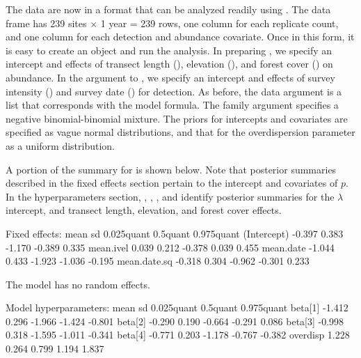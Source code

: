 \documentclass[codesnippet]{jss}
\begin{document}
The data are now in a format that can be analyzed readily using . The data frame has 239 sites $\times$ 1 year = 239 rows, one column for each replicate count, and one column for each detection and abundance covariate. Once in this form, it is easy to create an  object and run the analysis. In preparing , we specify an intercept and effects of transect length (), elevation (), and forest cover () on abundance. In the  argument to , we specify an intercept and effects of survey intensity () and survey date () for detection. As before, the data argument is a list that corresponds with the model formula. The family argument specifies a negative binomial-binomial mixture. The priors for intercepts and covariates are specified as vague normal distributions, and that for the overdispersion parameter as a uniform distribution. 


A portion of the summary for  is shown below. Note that posterior summaries described in the fixed effects section pertain to the intercept and covariates of $p$. In the hyperparameters section, , , , and  identify posterior summaries for the $\lambda$ intercept, and transect length, elevation, and forest cover effects.

\begin{CodeOutput}
Fixed effects:
               mean    sd 0.025quant  0.5quant  0.975quant
(Intercept)  -0.397 0.383     -1.170    -0.389       0.335
mean.ivel     0.039 0.212     -0.378     0.039       0.455
mean.date    -1.044 0.433     -1.923    -1.036      -0.195
mean.date.sq -0.318 0.304     -0.962    -0.301       0.233

The model has no random effects.

Model hyperparameters:
             mean     sd  0.025quant  0.5quant  0.975quant
beta[1]    -1.412  0.296      -1.966    -1.424      -0.801 
beta[2]    -0.290  0.190      -0.664    -0.291       0.086
beta[3]    -0.998  0.318      -1.595    -1.011      -0.341
beta[4]    -0.771  0.203      -1.178    -0.767      -0.382
overdisp    1.228  0.264       0.799     1.194       1.837
\end{CodeOutput}
\end{document}
